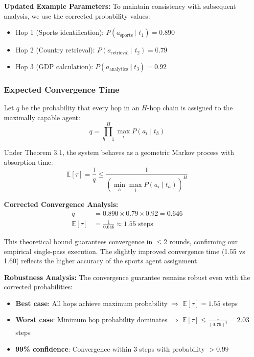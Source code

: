 \documentclass{article}
\begin{document}
\textbf{Updated Example Parameters:} To maintain consistency with subsequent analysis, we use the corrected probability values:
\begin{itemize}
\item Hop 1 (Sports identification): $P(a_{\text{sports}} \mid t_1) = 0.890$
\item Hop 2 (Country retrieval): $P(a_{\text{retrieval}} \mid t_2) = 0.79$ 
\item Hop 3 (GDP calculation): $P(a_{\text{analytics}} \mid t_3) = 0.92$
\end{itemize}

\subsubsection{Expected Convergence Time}

Let $q$ be the probability that every hop in an $H$-hop chain is assigned to the maximally capable agent:
\begin{equation}
q = \prod_{h=1}^{H} \max_i P(a_i \mid t_h)
\end{equation}

Under Theorem 3.1, the system behaves as a geometric Markov process with absorption time:
\begin{equation}
\mathbb{E}[\tau] = \frac{1}{q} \leq \frac{1}{(\min_h \max_i P(a_i \mid t_h))^H}
\end{equation}

\textbf{Corrected Convergence Analysis:}
\begin{align}
q &= 0.890 \times 0.79 \times 0.92 = 0.646\\[4pt]
\mathbb{E}[\tau] &= \frac{1}{0.646} \approx 1.55 \text{ steps}
\end{align}


This theoretical bound guarantees convergence in $\leq 2$ rounds, confirming our empirical single-pass execution. The slightly improved convergence time (1.55 vs 1.60) reflects the higher accuracy of the sports agent assignment.

\textbf{Robustness Analysis:} The convergence guarantee remains robust even with the corrected probabilities:
\begin{itemize}
\item \textbf{Best case}: All hops achieve maximum probability $\Rightarrow$ $\mathbb{E}[\tau] = 1.55$ steps
\item \textbf{Worst case}: Minimum hop probability dominates $\Rightarrow$ $\mathbb{E}[\tau] \leq \frac{1}{(0.79)^3} = 2.03$ steps
\item \textbf{99\% confidence}: Convergence within 3 steps with probability $> 0.99$
\end{itemize}
\end{document}
